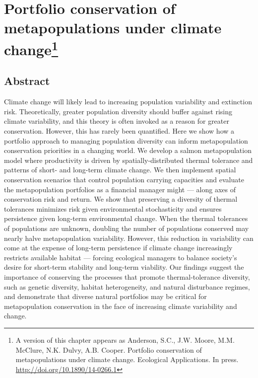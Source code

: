 \chapter[Metapopulation portfolio conservation]{Portfolio conservation of
  metapopulations under climate change\footnote{A version of this chapter
    appears as Anderson, S.C., J.W. Moore, M.M. McClure, N.K. Dulvy, A.B.
    Cooper. Portfolio conservation of metapopulations under climate change.
    Ecological Applications. In press.
    \url{http://doi.org/10.1890/14-0266.1}}}

\newcommand{\somR}{Appendix A}
\newcommand{\somparam}{Appendix B}
\newcommand{\somstray}{Appendix C}
\newcommand{\somsens}{Appendix D}
\newcommand{\somcor}{Appendix E}
\newcommand{\somts}{Appendix F}

\section{Abstract}\label{abstract}

Climate change will likely lead to increasing population variability and extinction risk. Theoretically, greater population diversity should buffer against rising climate variability, and this theory is often invoked as a reason for greater conservation. However, this has rarely been quantified. Here we show how a portfolio approach to managing population diversity can inform metapopulation conservation priorities in a changing world. We develop a salmon metapopulation model where productivity is driven by spatially-distributed thermal tolerance and patterns of short- and long-term climate change. We then implement spatial conservation scenarios that control population carrying capacities and evaluate the metapopulation portfolios as a financial manager might --- along axes of conservation risk and return. We show that preserving a diversity of thermal tolerances minimizes risk given environmental stochasticity and ensures persistence given long-term environmental change. When the thermal tolerances of populations are unknown, doubling the number of populations conserved may nearly halve metapopulation variability. However, this reduction in variability can come at the expense of long-term persistence if climate change increasingly restricts available habitat --- forcing ecological managers to balance society's desire for short-term stability and long-term viability. Our findings suggest the importance of conserving the processes that promote thermal-tolerance diversity, such as genetic diversity, habitat heterogeneity, and natural disturbance regimes, and demonstrate that diverse natural portfolios may be critical for metapopulation conservation in the face of increasing climate variability and change.

